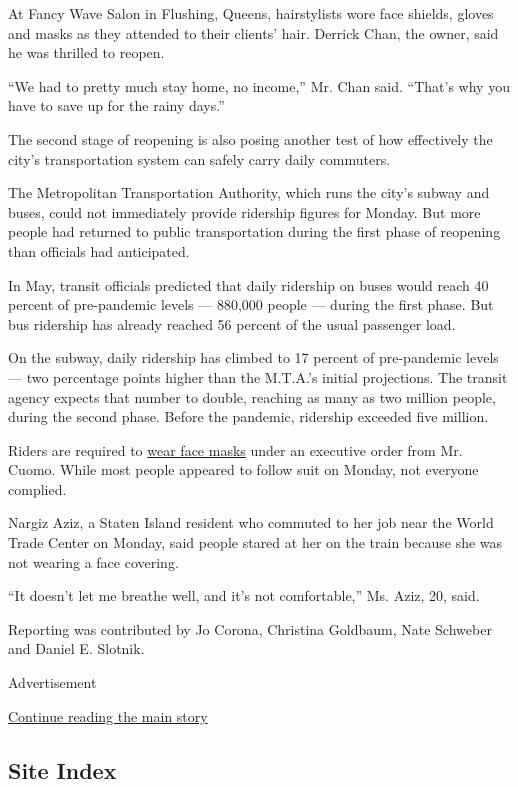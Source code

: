At Fancy Wave Salon in Flushing, Queens, hairstylists wore face shields,
gloves and masks as they attended to their clients' hair. Derrick Chan,
the owner, said he was thrilled to reopen.

``We had to pretty much stay home, no income,'' Mr. Chan said. ``That's
why you have to save up for the rainy days.''

The second stage of reopening is also posing another test of how
effectively the city's transportation system can safely carry daily
commuters.

The Metropolitan Transportation Authority, which runs the city's subway
and buses, could not immediately provide ridership figures for Monday.
But more people had returned to public transportation during the first
phase of reopening than officials had anticipated.

In May, transit officials predicted that daily ridership on buses would
reach 40 percent of pre-pandemic levels --- 880,000 people --- during
the first phase. But bus ridership has already reached 56 percent of the
usual passenger load.

On the subway, daily ridership has climbed to 17 percent of pre-pandemic
levels --- two percentage points higher than the M.T.A.'s initial
projections. The transit agency expects that number to double, reaching
as many as two million people, during the second phase. Before the
pandemic, ridership exceeded five million.

Riders are required to
\href{https://www.nytimes3xbfgragh.onion/article/coronavirus-N95-mask-DIY-face-mask-health.html}{wear
face masks} under an executive order from Mr. Cuomo. While most people
appeared to follow suit on Monday, not everyone complied.

Nargiz Aziz, a Staten Island resident who commuted to her job near the
World Trade Center on Monday, said people stared at her on the train
because she was not wearing a face covering.

``It doesn't let me breathe well, and it's not comfortable,'' Ms. Aziz,
20, said.

Reporting was contributed by Jo Corona, Christina Goldbaum, Nate
Schweber and Daniel E. Slotnik.

Advertisement

\protect\hyperlink{after-bottom}{Continue reading the main story}

\hypertarget{site-index}{%
\subsection{Site Index}\label{site-index}}

